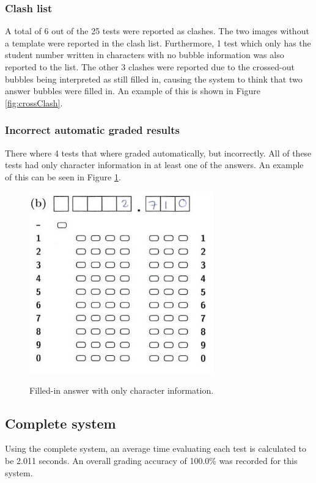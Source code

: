 \subsubsection{Clash list}
A total of 6 out of the 25 tests were reported as clashes. The two images without a template were reported in the clash list. Furthermore, 1 test which only has the student number written in characters with no bubble information was also reported to the list. The other 3 clashes were reported due to the crossed-out bubbles being interpreted as still filled in, causing the system to think that two answer bubbles were filled in. An example of this is shown in Figure \ref{fig:crossClash}.

\subsubsection{Incorrect automatic graded results}

There where 4 tests that where graded automatically, but incorrectly. All of these tests had only character information in at least one of the answers. An example of this can be seen in Figure \ref{fig:OnlyCharacters}.

\begin{figure}
  \centering
  \includegraphics[width=8cm]{OnlyCharacters}\\
  \caption{Filled-in answer with only character information.}
  \label{fig:OnlyCharacters}
\end{figure}

\subsection{Complete system}

Using the complete system, an average time evaluating each test is calculated to be 2.011 seconds. An overall grading accuracy of 100.0\% was recorded for this system.

